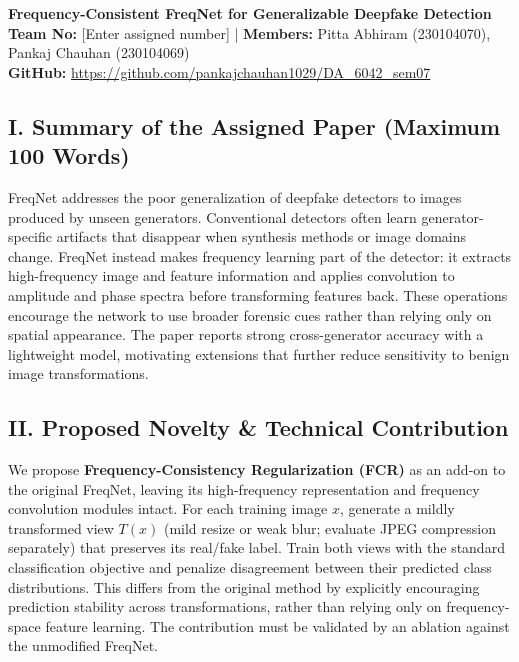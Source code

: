 \documentclass[8pt,a4paper]{article}
\begin{document}
\thispagestyle{empty}
\begin{center}
{\large\bfseries Frequency-Consistent FreqNet for Generalizable Deepfake Detection}\\[4pt]
\textbf{Team No:} [Enter assigned number] \quad | \quad \textbf{Members:} Pitta Abhiram (230104070), Pankaj Chauhan (230104069)\\[3pt]
\textbf{GitHub:} \url{https://github.com/pankajchauhan1029/DA_6042_sem07}
\end{center}
\vspace{-5pt}
\subsection*{I. Summary of the Assigned Paper (Maximum 100 Words)}
FreqNet addresses the poor generalization of deepfake detectors to images produced by unseen generators. Conventional detectors often learn generator-specific artifacts that disappear when synthesis methods or image domains change. FreqNet instead makes frequency learning part of the detector: it extracts high-frequency image and feature information and applies convolution to amplitude and phase spectra before transforming features back. These operations encourage the network to use broader forensic cues rather than relying only on spatial appearance. The paper reports strong cross-generator accuracy with a lightweight model, motivating extensions that further reduce sensitivity to benign image transformations.
\subsection*{II. Proposed Novelty \& Technical Contribution}
We propose \textbf{Frequency-Consistency Regularization (FCR)} as an add-on to the original FreqNet, leaving its high-frequency representation and frequency convolution modules intact. For each training image $x$, generate a mildly transformed view $T(x)$ (mild resize or weak blur; evaluate JPEG compression separately) that preserves its real/fake label. Train both views with the standard classification objective and penalize disagreement between their predicted class distributions. This differs from the original method by explicitly encouraging prediction stability across transformations, rather than relying only on frequency-space feature learning. The contribution must be validated by an ablation against the unmodified FreqNet.
\end{document}
